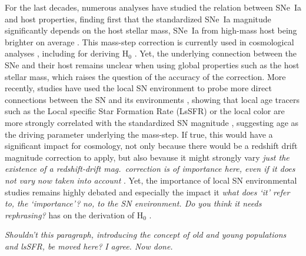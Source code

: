 \documentclass[]{aa} %
\newcommand{\nn}[1]{{\textcolor[rgb]{0.25, 0.50, 0}{#1}}}
\newcommand{\yc}[1]{{\textcolor{BrickRed}{#1}}}
\begin{document}
For the last decades, numerous analyses have studied the relation between SNe~Ia
and host properties, finding first that the standardized SNe~Ia magnitude
significantly depends on the host stellar mass, SNe~Ia from high-mass host being
brighter on average \cite[e.g.][]{kelly2010, sullivan2010, childress2013,
betoule2014, rigault2018, kim19}.  This mass-step correction is currently used
in cosmological analyses \citep[e.g.][]{betoule2014, scolnic2018a}, including
for deriving H$_0$ \citep{riess2016, riess2019}. Yet, the underlying connection
between the SNe and their host remains unclear when using global properties such
as the host stellar mass, which raises the question of the accuracy of the
correction. More recently, studies have used the local SN environment to probe
more direct connections between the SN and its environments \citep{rigault2013},
showing that local age tracers such as the Local specific Star Formation Rate
\nn{(LsSFR)} or the local color are more strongly correlated with the standardized
SN magnitude \citep{rigault2018, roman2018, kim18}, suggesting age as the
driving parameter underlying the mass-step. If true, this would have a
significant impact for cosmology\nn{, not only because there would be a redshift
drift magnitude correction to apply, but also bevause it might strongly
vary} \yc{\textit{just the existence of a redshift-drift mag.\ correction is
of importance here, even if it does not vary}} \nn{\textit{now taken
into account}} \citep{rigault2013, childress2014, scolnic2018a}. Yet, the
importance of local SN environmental studies remains highly debated
\cite[e.g.][]{jones2015, jones2019} and especially the impact it
\yc{\textit{what does `it' refer to, the `importance'?}} \nn{\textit{no, to the
SN environment. Do you think it needs rephrasing?}} has on the derivation of
H$_0$ \citep{jones2015, riess2016, riess2018, rose2019}.

\yc{\textit{Shouldn't this paragraph, introducing the concept of old and young
populations and lsSFR, be moved \emph{\nn{here}}?}} \nn{\textit{I agree. Now
done.}}
\end{document}
